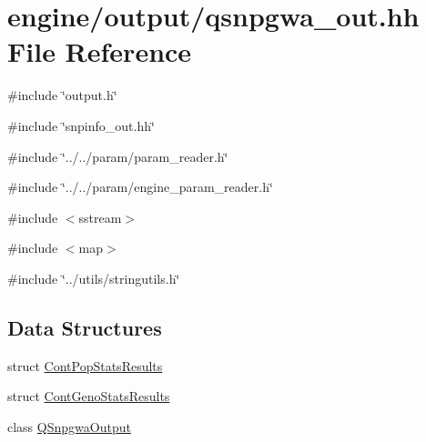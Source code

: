\hypertarget{qsnpgwa__out_8hh}{
\section{engine/output/qsnpgwa\_\-out.hh File Reference}
\label{qsnpgwa__out_8hh}
}
{\ttfamily \#include \char`\"{}output.h\char`\"{}}\par
{\ttfamily \#include \char`\"{}snpinfo\_\-out.hh\char`\"{}}\par
{\ttfamily \#include \char`\"{}../../param/param\_\-reader.h\char`\"{}}\par
{\ttfamily \#include \char`\"{}../../param/engine\_\-param\_\-reader.h\char`\"{}}\par
{\ttfamily \#include $<$sstream$>$}\par
{\ttfamily \#include $<$map$>$}\par
{\ttfamily \#include \char`\"{}../utils/stringutils.h\char`\"{}}\par
\subsection*{Data Structures}
\begin{DoxyCompactItemize}
\item 
struct \hyperlink{structContPopStatsResults}{ContPopStatsResults}
\item 
struct \hyperlink{structContGenoStatsResults}{ContGenoStatsResults}
\item 
class \hyperlink{classQSnpgwaOutput}{QSnpgwaOutput}
\end{DoxyCompactItemize}
